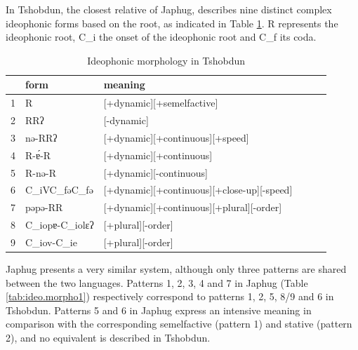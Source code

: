 \documentclass[oldfontcommands,oneside,a4paper,11pt]{article}
\newcommand{\ipa}[1]{{\phon \mbox{#1}}} %
\begin{document}
 In Tshobdun, the closest relative of Japhug, \citet[3-4]{jackson04zhuangmaoci} describes nine distinct complex ideophonic forms based on the root, as indicated in Table \ref{tab:tshobdun1}. R represents the ideophonic root, C_i the onset of the ideophonic root and C_f its coda. 

\begin{table}[h]
\caption{Ideophonic morphology in Tshobdun} \label{tab:tshobdun1}
\begin{tabular}{llllll}
\toprule
&form & meaning  \\
\midrule
1 & R& 	 [+dynamic][+semelfactive]\\
2&RR\ipa{ʔ} & [-dynamic]  \\
3&\ipa{nə}-RR\ipa{ʔ} & [+dynamic][+continuous][+speed]  \\
4&R-\ipa{ɐ́}-R & [+dynamic][+continuous]   \\
5&R-\ipa{nə}-R & [+dynamic][-continuous] \\
6&C_iVC_f\ipa{ə}C_f\ipa{ə}  & [+dynamic][+continuous][+close-up][-speed] \\
7&\ipa{pəpə}-RR & [+dynamic][+continuous][+plural][-order]   \\
8& C_i\ipa{opɐ}-C_i\ipa{olɛʔ}&[+plural][-order]   \\
9& C_i\ipa{ov}-C_i\ipa{e}&[+plural][-order]   \\
\bottomrule
\end{tabular}
\end{table}



Japhug presents a very similar system, although only three   patterns are shared between the two languages. Patterns 1, 2, 3, 4 and 7 in Japhug (Table \ref{tab:ideo.morpho1}) respectively correspond to patterns 1, 2, 5, 8/9 and 6 in Tshobdun. Patterns 5 and 6 in Japhug express an intensive meaning in comparison with the corresponding semelfactive (pattern 1) and stative (pattern 2), and  no equivalent is described in Tshobdun. 
\end{document}
